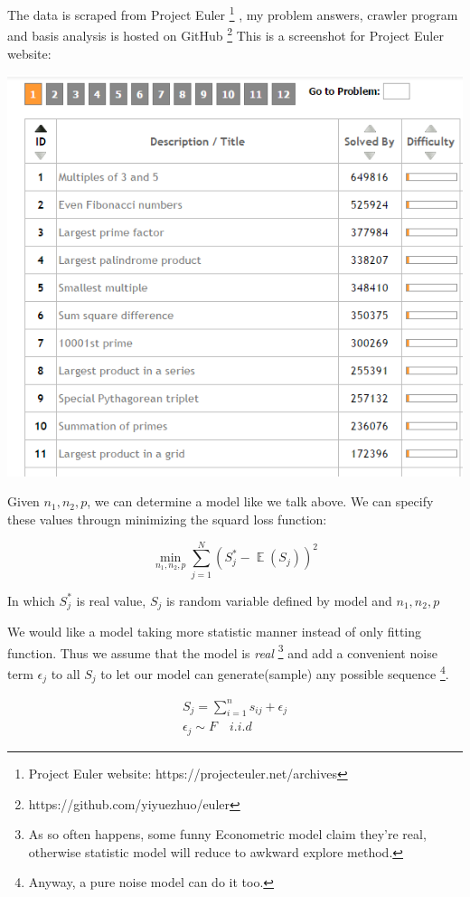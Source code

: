 \documentclass{article}
\DeclareMathOperator{\E}{\mathbb{E}}
\begin{document}
The data is scraped from Project Euler \footnote{Project Euler website: https://projecteuler.net/archives }
, my problem answers, crawler program and basis analysis is hosted on GitHub \footnote{https://github.com/yiyuezhuo/euler }
This is a screenshot for Project Euler website:

\includegraphics[scale=0.55]{euler-oj.png}

Given $n_1,n_2,p$, we can determine a model like we talk above. 
We can specify these values througn minimizing the squard loss function:

\[
\min_{n_1,n_2,p} \sum_{j=1}^N (S^*_j - \E(S_j))^2
\]

In which $S^*_j$ is real value, $S_j$ is random variable defined by model and $n_1,n_2,p$

We would like a model taking more statistic manner instead of only fitting function. 
Thus we assume that the model is \textit{real} 
\footnote{As so often happens, some funny Econometric model claim they're real, 
otherwise statistic model will reduce to awkward explore method.} 
and add a convenient noise term  $\epsilon_j$  to all $S_j$ to let our model can generate(sample) 
any possible sequence \footnote{Anyway, a pure noise model can do it too.}.

\begin{align*}
S_j = \sum_{i=1}^n s_{ij} + \epsilon_j \\
\epsilon_j \sim F \quad i.i.d 
\end{align*}
\end{document}
